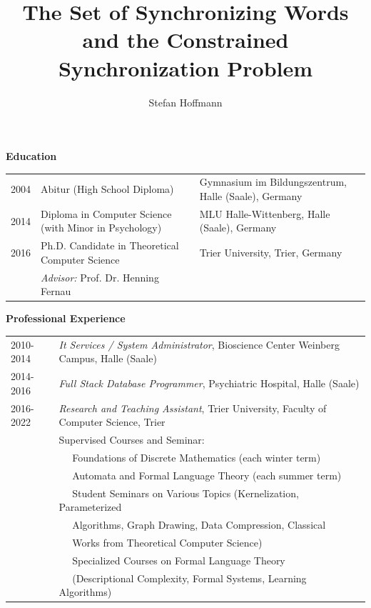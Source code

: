 \documentclass[a4paper,12pt,twoside,openright]{book}
\title{The Set of Synchronizing Words and the Constrained Synchronization Problem}
\author{Stefan Hoffmann}
\begin{document}
	
	
\begin{center} 
	\textbf{Education} 
\end{center} 

\hspace*{-1.2cm}
\begin{tabular}{lp{8cm}p{5cm}}
	2004 & Abitur (High School Diploma)                           & Gymnasium im Bildungszentrum, Halle (Saale), Germany \\
	2014 & Diploma in Computer Science (with Minor in Psychology) & MLU Halle-Wittenberg, Halle (Saale), Germany \\
	2016 & Ph.D. Candidate in Theoretical Computer Science                  & Trier University, Trier, Germany \\
	& \emph{Advisor:} Prof. Dr. Henning Fernau                    &
\end{tabular}

\begin{center} %
	\textbf{Professional Experience}
\end{center} 

\hspace*{-1.2cm}
\begin{tabular}{lp{12.8cm}}
	2010-2014 & \emph{It Services / System Administrator}, Bioscience Center Weinberg Campus, Halle (Saale) \\ 
	2014-2016 & \emph{Full Stack Database Programmer}, Psychiatric Hospital, Halle (Saale) \\
	2016-2022 & \emph{Research and Teaching Assistant}, Trier University, Faculty of Computer Science, Trier \\
	& Supervised Courses and Seminar: \\
	& $\quad$ Foundations of Discrete Mathematics (each winter term) \\
	& $\quad$ Automata and Formal Language Theory (each summer term) \\
	& $\quad$ Student Seminars on Various Topics (Kernelization, Parameterized \\ 
	& $\quad$ Algorithms, Graph Drawing, Data Compression, Classical \\ 
	& $\quad$ Works from Theoretical Computer Science) \\
	& $\quad$ Specialized Courses on Formal Language Theory \\ 
	& $\quad$ (Descriptional Complexity, Formal Systems, Learning Algorithms)
\end{tabular}

%
\end{document}
